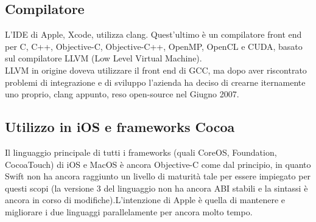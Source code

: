 \subsection{Compilatore}
L'IDE di Apple, Xcode, utilizza clang. Quest'ultimo è un compilatore front end per C, C++, Objective-C, Objective-C++, OpenMP, OpenCL e CUDA, basato sul compilatore LLVM (Low Level Virtual Machine).\\
LLVM in origine doveva utilizzare il front end di GCC, ma dopo aver riscontrato problemi di integrazione e di sviluppo l'azienda ha deciso di crearne iternamente uno proprio, clang appunto, reso open-source nel Giugno 2007. 
\subsection{Utilizzo in iOS e frameworks Cocoa}
Il linguaggio principale di tutti i frameworks (quali CoreOS, Foundation, CocoaTouch) di iOS e MacOS è ancora Objective-C come dal principio, in quanto Swift non ha ancora raggiunto un livello di maturità tale per essere impiegato per questi scopi (la versione 3 del linguaggio non ha ancora ABI stabili e la sintassi è ancora in corso di modifiche).L'intenzione di Apple è quella di mantenere e migliorare i due linguaggi parallelamente per ancora molto tempo.